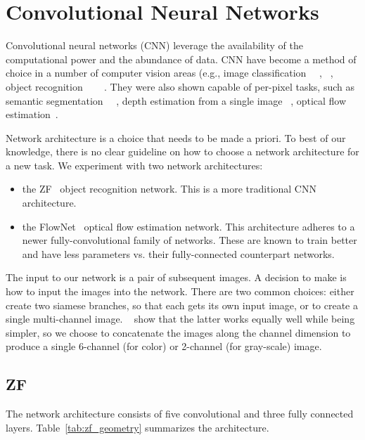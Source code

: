 \section{Convolutional Neural Networks}

Convolutional neural networks (CNN) leverage the availability of the
computational power and the abundance of data.  CNN have become a
method of choice in a number of computer vision areas (e.g., image
classification~\cite{krizhevsky2012imagenet} ~\cite{simonyan2014very},
~\cite{szegedy2015going}, object recognition
~\cite{sermanet2013overfeat}~\cite{girshick2014rich}
~\cite{he2014spatial}.  They were also shown capable of per-pixel
tasks, such as semantic segmentation
~\cite{ning2005toward}~\cite{gupta2014learning}, depth estimation from
a single image ~\cite{liu2016learning}, optical flow
estimation~\cite{fischer2015flownet}.

Network architecture is a choice that needs to be made a priori.  To
best of our knowledge, there is no clear guideline on how to choose a
network architecture for a new task.  We experiment with two network architectures:

\begin{itemize}
\item the ZF~\cite{DBLP:journals/corr/ZeilerF13} object recognition
  network.  This is a more traditional CNN architecture.
\item the FlowNet~\cite{fischer2015flownet} optical flow estimation
  network.  This architecture adheres to a newer fully-convolutional
  family of networks.  These are known to train better and have less
  parameters vs. their fully-connected counterpart networks.
\end{itemize}

The input to our network is a pair of subsequent images.  A decision
to make is how to input the images into the network.  There are two
common choices: either create two siamese branches, so that each gets
its own input image, or to create a single multi-channel image.
~\cite{fischer2015flownet} show that the latter works equally well
while being simpler, so we choose to concatenate the images along the
channel dimension to produce a single 6-channel (for color) or
2-channel (for gray-scale) image.

\subsection{ZF}

The network architecture consists of five convolutional and three
fully connected layers.  Table~\ref{tab:zf_geometry} summarizes the
architecture.

